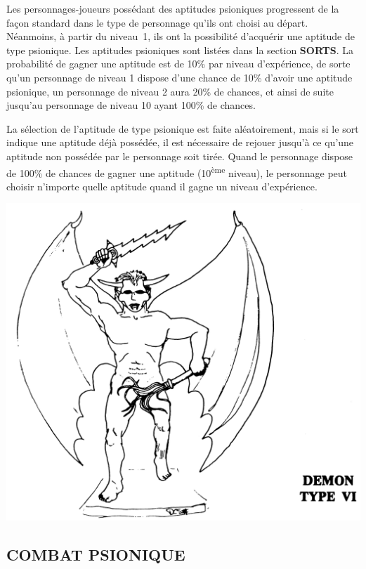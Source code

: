 \documentclass[11pt]{article}
\begin{document}
{Les personnages-joueurs possédant des aptitudes psioniques progressent de la façon standard dans le type de personnage qu'ils ont choisi au départ. Néanmoins, à partir du niveau~1, ils ont la possibilité d'acquérir une aptitude de type psionique. Les aptitudes psioniques sont listées dans la section \textbf{SORTS}. La probabilité de gagner une aptitude est de 10\% par niveau d'expérience, de sorte qu'un personnage de niveau 1 dispose d'une chance de 10\% d'avoir une aptitude psionique, un personnage de niveau 2 aura 20\% de chances, et ainsi de suite jusqu'au personnage de niveau 10 ayant 100\% de chances.

\bigskip

La sélection de l'aptitude de type psionique est faite aléatoirement, mais si le sort indique une aptitude déjà possédée, il est nécessaire de rejouer  jusqu'à ce qu'une aptitude non possédée par le personnage soit tirée. Quand le personnage dispose de 100\% de chances de gagner une aptitude (10\textsuperscript{ème} niveau), le personnage peut choisir n'importe quelle aptitude quand il gagne un niveau d'expérience.

\begin{center}
\includegraphics[scale=0.17]{./images/demon-typeVI.jpg}
\end{center}

\subsection*{\normalsize COMBAT PSIONIQUE}

}
\end{document}
